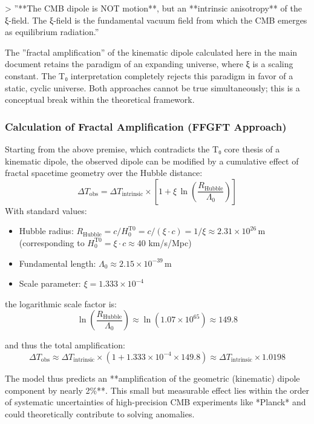 	> ''**The CMB dipole is NOT motion**, but an **intrinsic anisotropy** of the ξ-field. The ξ-field is the fundamental vacuum field from which the CMB emerges as equilibrium radiation.''
	
	The ''fractal amplification'' of the kinematic dipole calculated here in the main document retains the paradigm of an expanding universe, where ξ is a scaling constant. The T₀ interpretation completely rejects this paradigm in favor of a static, cyclic universe. Both approaches cannot be true simultaneously; this is a conceptual break within the theoretical framework.
	
	\subsubsection*{Calculation of Fractal Amplification (FFGFT Approach)}
	
	Starting from the above premise, which contradicts the T₀ core thesis of a kinematic dipole, the observed dipole can be modified by a cumulative effect of fractal spacetime geometry over the Hubble distance:
	\[
	\Delta T_{\text{obs}} = \Delta T_{\text{intrinsic}} \times \left[1 + \xi \, \ln\left(\frac{R_{\text{Hubble}}}{\Lambda_0}\right)\right]
	\]
	With standard values:
	\begin{itemize}
		\item Hubble radius: $R_{\text{Hubble}} = c/H_0^{\text{T0}} = c/(\xi \cdot c) = 1/\xi \approx 2.31 \times 10^{26} \, \text{m}$ (corresponding to $H_0^{\text{T0}} = \xi \cdot c \approx 40$ km/s/Mpc)
		\item Fundamental length: $\Lambda_0 \approx 2.15 \times 10^{-39} \, \text{m}$
		\item Scale parameter: $\xi = 1.333 \times 10^{-4}$
	\end{itemize}
	
	the logarithmic scale factor is:
	\[
	\ln\left(\frac{R_{\text{Hubble}}}{\Lambda_0}\right) \approx \ln(1.07 \times 10^{65}) \approx 149.8
	\]
	
	and thus the total amplification:
	\[
	\Delta T_{\text{obs}} \approx \Delta T_{\text{intrinsic}} \times (1 + 1.333\times10^{-4} \times 149.8) \approx \Delta T_{\text{intrinsic}} \times 1.0198
	\]
	
	The model thus predicts an **amplification of the geometric (kinematic) dipole component by nearly 2\%**. This small but measurable effect lies within the order of systematic uncertainties of high-precision CMB experiments like *Planck* and could theoretically contribute to solving anomalies.
	
